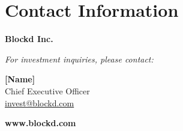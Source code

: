 \documentclass[11pt,letterpaper]{article}
\begin{document}
\section{Contact Information}

\vspace{1cm}

\begin{center}
\Large\textbf{Blockd Inc.}

\vspace{0.5cm}

\textit{For investment inquiries, please contact:}

\vspace{0.5cm}

\textbf{[Name]}\\
Chief Executive Officer\\
\href{mailto:invest@blockd.com}{invest@blockd.com}\\
[Phone Number]

\vspace{1cm}

\textcolor{blockdblue}{\Large\textbf{www.blockd.com}}
\end{center}

\end{document}
